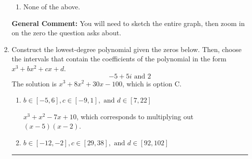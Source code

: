 \documentclass{extbook}[14pt]
\newcommand{\litem}[1]{\item #1

\rule{\textwidth}{0.4pt}}
\begin{document}
\begin{enumerate}
{\begin{enumerate}[label=\Alph*.]
\item None of the above.\end{enumerate}
\textbf{General Comment:} You will need to sketch the entire graph, then zoom in on the zero the question asks about.
}
\litem{
Construct the lowest-degree polynomial given the zeros below. Then, choose the intervals that contain the coefficients of the polynomial in the form $x^3+bx^2+cx+d$.
\[ -5 + 5 i \text{ and } 2 \]The solution is \( x^{3} +8 x^{2} +30 x -100 \), which is option C.\begin{enumerate}[label=\Alph*.]
\item \( b \in [-5, 6], c \in [-9, 1], \text{ and } d \in [7, 22] \)

$x^{3} + x^{2} -7 x + 10$, which corresponds to multiplying out $(x -5)(x -2)$.
\item \( b \in [-12, -2], c \in [29, 38], \text{ and } d \in [92, 102] \)


\end{enumerate}}
\end{enumerate}
\end{document}
